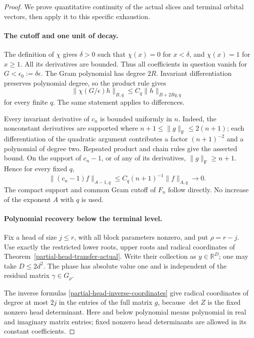 \begin{proof}
We prove quantitative continuity of the actual slices and terminal
orbital vectors, then apply it to this specific exhaustion.

\paragraph{The cutoff and one unit of decay.}
The definition of $\chi$ gives $\delta>0$ such that $\chi(x)=0$
for $x<\delta$, and $\chi(x)=1$ for $x\ge1$.  All its derivatives
are bounded.  Thus all coefficients in question vanish for
$G<\epsilon_0:=\delta\epsilon$.  The Gram polynomial has degree
$2R$.  Invariant differentiation preserves polynomial degree, so
the product rule gives
\begin{equation}\label{finite-decay-gram-cost}
 \|\chi(G/\epsilon)h\|_{B,q}
                       \le C_q\|h\|_{B+2Rq,q}
\end{equation}
for every finite $q$.  The same statement applies to differences.

Every invariant derivative of $c_n$ is bounded uniformly in $n$.
Indeed, the nonconstant derivatives are supported where
$n+1\le\|g\|_{\mathrm F}\le2(n+1)$; each differentiation of
the quadratic argument contributes a factor $(n+1)^{-2}$ and
a polynomial of degree two.  Repeated product and chain rules give
the asserted bound.  On the support of $c_n-1$, or of any of its
derivatives, $\|g\|_{\mathrm F}\ge n+1$.  Hence for every fixed $q$,
\begin{equation}\label{finite-decay-cutoff-convergence}
 \|(c_n-1)f\|_{A-1,q}\le C_q(n+1)^{-1}\|f\|_{A,q}
                                  \longrightarrow0.
\end{equation}
The compact support and common Gram cutoff of $F_n$ follow directly.
No increase of the exponent $A$ with $q$ is used.

\paragraph{Polynomial recovery below the terminal level.}
Fix a head of size $j\le r$, with all block parameters nonzero,
and put $\rho=r-j$.  Use exactly the restricted lower roots,
upper roots and radical coordinates of
Theorem~\ref{partial-head-transfer-actual}.  Write their collection
as $y\in\mathbb R^D$; one may take $D\le2d^2$.  The phase has
absolute value one and is independent of the residual matrix
$\gamma\in G_\rho$.

The inverse formulas \eqref{partial-head-inverse-coordinates} give
radical coordinates of degree at most $2j$ in the entries of the
full matrix $g$, because $\det Z$ is the fixed nonzero head
determinant.  Here and below polynomial means polynomial in real
and imaginary matrix entries; fixed nonzero head determinants
are allowed in its constant coefficients.


\end{proof}
